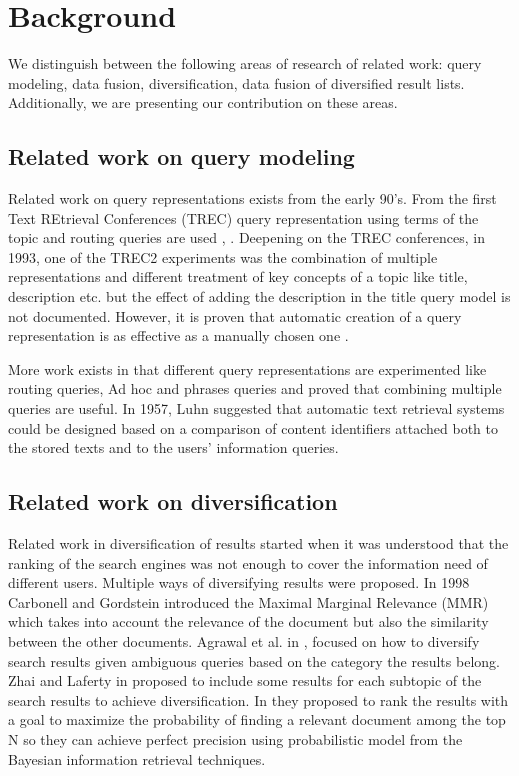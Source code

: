 
\chapter{Background}

We distinguish between the following areas of research of related work: query modeling, data fusion, diversification, data fusion of diversified result lists. Additionally, we are presenting our contribution on these areas.

\section{Related work on query modeling}
Related work on query representations exists from the early 90's. From the first Text REtrieval Conferences (TREC) query representation using terms of the topic and routing queries are used \cite{Trec1}, \cite{Trec2}. Deepening on the TREC conferences, in 1993, one of the TREC2 experiments was the combination of multiple representations and different treatment of key concepts of a topic like title, description etc. but the effect of adding the description in the title query model is not documented. However, it is proven that automatic creation of a query representation is as effective as a manually chosen one \cite{Trec2}.

More work exists in \cite{CallanCroft} that different query representations are experimented like routing queries, Ad hoc and phrases queries and proved that combining multiple queries are useful. In 1957, Luhn \cite{Luhn} suggested that automatic text retrieval systems could be designed based on a comparison of content identifiers attached both to the stored texts and to the users’ information queries.

\section{Related work on diversification}
Related work in diversification of results started when it was understood that the ranking of the search engines was not enough to cover the information need of different users. Multiple ways of diversifying results were proposed. In 1998 Carbonell and Gordstein \cite{CarbonellGoldstein} introduced the Maximal Marginal Relevance (MMR) which takes into account the relevance of the document but also the similarity between the other documents. Agrawal et al. in \cite{Agrawal}, focused on how to diversify search results given ambiguous queries based on the category the results belong. Zhai and Laferty in \cite{ZhaiLaferty06} proposed to include some results for each subtopic of the search results to achieve diversification. In \cite{ChenKarger} they proposed to rank the results with a goal to maximize the probability of finding a relevant document among the top N so they can achieve perfect precision using probabilistic model from the Bayesian information retrieval techniques.

